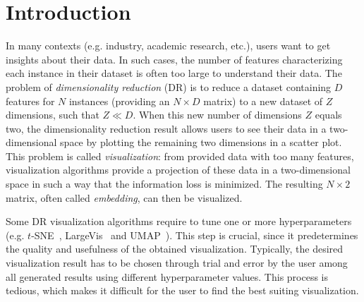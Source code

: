 \section{Introduction}


In many contexts (e.g. industry, academic research, etc.), users want to get insights about their data. In such cases, the number of features characterizing each instance in their dataset is often too large to understand their data. The problem of {\it dimensionality reduction} (DR) is to reduce a dataset containing $D$ features for $N$ instances (providing an $N \times D$ matrix) to a new dataset of $Z$ dimensions, such that $Z \ll D$. When this new number of dimensions $Z$ equals two, the dimensionality reduction result allows users to see their data in a two-dimensional space by plotting the remaining two dimensions in a scatter plot. This problem is called {\it visualization}: from provided data with too many features, visualization algorithms provide a projection of these data in a two-dimensional space in such a way that the information loss is minimized. The resulting $N \times 2$ matrix, often called {\it embedding}, can then be visualized.


Some DR visualization algorithms require to tune one or more hyperparameters (e.g. $t$-SNE~\cite{maaten2008tsne}, LargeVis~\cite{tang2016visualizing} and UMAP~\cite{mcinnes2018umap}). This step is crucial, since it predetermines the quality and usefulness of the obtained visualization. Typically, the desired visualization result has to be chosen through trial and error by the user among all generated results using different hyperparameter values. This process is tedious, which makes it difficult for the user to find the best suiting visualization.

